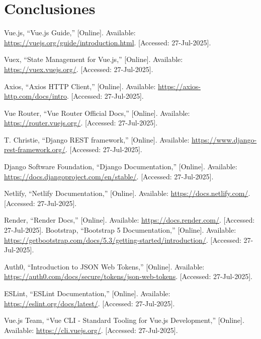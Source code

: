 \documentclass{article}
\begin{document}
\section{Conclusiones}

\begin{thebibliography}{00}

Vue.js, “Vue.js Guide,” [Online]. Available: \url{https://vuejs.org/guide/introduction.html}. [Accessed: 27-Jul-2025].

Vuex, “State Management for Vue.js,” [Online]. Available: \url{https://vuex.vuejs.org/}. [Accessed: 27-Jul-2025].

Axios, “Axios HTTP Client,” [Online]. Available: \url{https://axios-http.com/docs/intro}. [Accessed: 27-Jul-2025].

Vue Router, “Vue Router Official Docs,” [Online]. Available: \url{https://router.vuejs.org/}. [Accessed: 27-Jul-2025].

T. Christie, “Django REST framework,” [Online]. Available: \url{https://www.django-rest-framework.org/}. [Accessed: 27-Jul-2025].

Django Software Foundation, “Django Documentation,” [Online]. Available: \url{https://docs.djangoproject.com/en/stable/}. [Accessed: 27-Jul-2025].

Netlify, “Netlify Documentation,” [Online]. Available: \url{https://docs.netlify.com/}. [Accessed: 27-Jul-2025].

Render, “Render Docs,” [Online]. Available: \url{https://docs.render.com/}. [Accessed: 27-Jul-2025].
Bootstrap, “Bootstrap 5 Documentation,” [Online]. Available: \url{https://getbootstrap.com/docs/5.3/getting-started/introduction/}. [Accessed: 27-Jul-2025].

Auth0, “Introduction to JSON Web Tokens,” [Online]. Available: \url{https://auth0.com/docs/secure/tokens/json-web-tokens}. [Accessed: 27-Jul-2025].

ESLint, “ESLint Documentation,” [Online]. Available: \url{https://eslint.org/docs/latest/}. [Accessed: 27-Jul-2025].

Vue.js Team, “Vue CLI - Standard Tooling for Vue.js Development,” [Online]. Available: \url{https://cli.vuejs.org/}. [Accessed: 27-Jul-2025].

\end{thebibliography}



    
\end{document}
